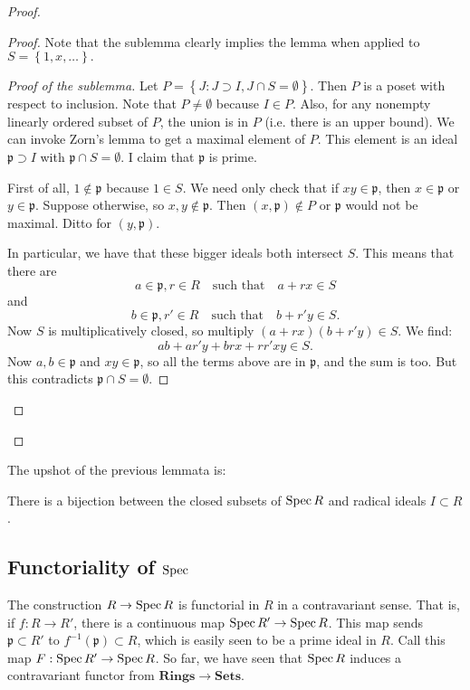 \begin{proof}
\begin{proof}
Note that the sublemma clearly implies the lemma when applied to $S =
\left\{1, x, \dots\right\}.$

\begin{proof}[Proof of the sublemma]
Let $P = \left\{J: J \supset I, J \cap S = \emptyset \right\}$. Then $P$ is a
poset with respect to  inclusion. Note that $P \neq \emptyset$ because $I \in P$.  Also,
for any nonempty linearly ordered subset of $P$, the union is in $P$ (i.e. there is an
upper bound).  
We can invoke Zorn's lemma to get a maximal element of $P$.  This element is an
ideal $\mathfrak{p} \supset I$ with $\mathfrak{p} \cap S = \emptyset$.  I claim
that $\mathfrak{p}$ is prime.

First of all, $1 \notin \mathfrak{p}$ because $1 \in S$.  We need only check
that if $xy \in \mathfrak{p}$, then $x \in \mathfrak{p}$ or $y \in
\mathfrak{p}$. Suppose otherwise, so $x,y \notin \mathfrak{p}$.  Then $(x,\mathfrak{p}) \notin P$ or
$\mathfrak{p}$ would not be maximal. Ditto for $(y, \mathfrak{p})$. 

In particular, we have that these bigger ideals both intersect $S$.  This means
that there are 
\[  a \in \mathfrak{p} , r \in R \quad \text{such that}\quad a+rx \in S \]
and 
\[  b \in \mathfrak{p} , r' \in R \quad \text{such that}\quad b+r'y \in S .\]
Now $S$ is multiplicatively closed, so multiply $(a+rx)(b+r'y) \in S$.
We find:
\[ ab + ar'y+brx+rr'xy \in S.  \]
Now $a,b \in \mathfrak{p}$ and $xy \in \mathfrak{p}$, so all the terms above
are in $\mathfrak{p}$, and the sum is too. But this contradicts $\mathfrak{p}
\cap S = \emptyset$. 
\end{proof}
\end{proof} 
\end{proof} 

The upshot of the previous lemmata is:
\begin{proposition}
There is a bijection between the closed subsets of $\operatorname{Spec} R$ and radical ideals
$I \subset R$.
\end{proposition}

\subsection{Functoriality of $\operatorname{Spec}$}
 The construction $R \to \operatorname{Spec} R$ is functorial in $R$ in a
contravariant sense.   That is,  if $f: R \to R'$, there is a continuous map $\operatorname{Spec}
R' \to \operatorname{Spec} R$. This map sends $\mathfrak{p} \subset R'$ to
$f^{-1}(\mathfrak{p}) \subset R$, which is easily seen to be a prime ideal
in $R$.   Call this map $F: \operatorname{Spec} R' \to \operatorname{Spec} R$. So far, we have seen that
$\operatorname{Spec} R$ induces a contravariant  functor from $\mathbf{Rings} \to \mathbf{Sets}$.

